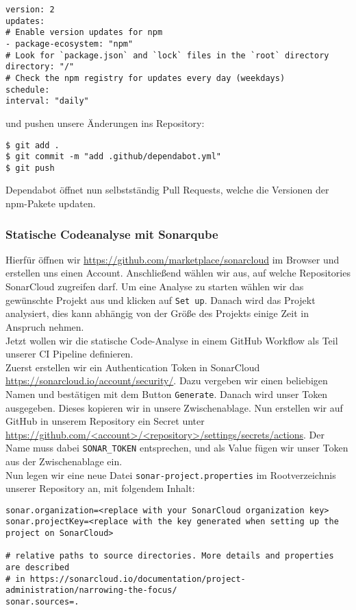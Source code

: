 \begin{verbatim}
version: 2
updates:
# Enable version updates for npm
- package-ecosystem: "npm"
# Look for `package.json` and `lock` files in the `root` directory
directory: "/"
# Check the npm registry for updates every day (weekdays)
schedule:
interval: "daily"
\end{verbatim}

\noindent
und pushen unsere Änderungen ins Repository:

\begin{verbatim}
$ git add .
$ git commit -m "add .github/dependabot.yml"
$ git push
\end{verbatim}

\noindent
Dependabot öffnet nun selbstständig Pull Requests,
welche die Versionen der npm-Pakete updaten.

\subsubsection{Statische Codeanalyse mit Sonarqube}
Hierfür öffnen wir \url{https://github.com/marketplace/sonarcloud}
im Browser und erstellen uns einen Account.
Anschließend wählen wir aus, auf welche Repositories
SonarCloud zugreifen darf.
Um eine Analyse zu starten wählen wir das gewünschte Projekt aus 
und klicken auf \verb|Set up|.
Danach wird das Projekt analysiert, dies kann abhängig von der Größe des Projekts einige Zeit in
Anspruch nehmen. \\

\noindent
Jetzt wollen wir die statische Code-Analyse in einem
GitHub Workflow als Teil unserer CI Pipeline definieren. \\

\noindent
Zuerst erstellen wir ein Authentication Token in 
SonarCloud \url{https://sonarcloud.io/account/security/}.
Dazu vergeben wir einen beliebigen Namen und bestätigen mit 
dem Button \verb|Generate|.
Danach wird unser Token ausgegeben. 
Dieses kopieren wir in unsere Zwischenablage.
Nun erstellen wir auf GitHub in unserem Repository
ein Secret unter \url{https://github.com/<account>/<repository>/settings/secrets/actions}.
Der Name muss dabei \verb|SONAR_TOKEN| entsprechen,
und als Value fügen wir unser Token aus der Zwischenablage ein. \\

\noindent
Nun legen wir eine neue Datei \verb|sonar-project.properties|
im Rootverzeichnis unserer Repository an, mit folgendem Inhalt:

\begin{verbatim}
sonar.organization=<replace with your SonarCloud organization key>
sonar.projectKey=<replace with the key generated when setting up the project on SonarCloud>

# relative paths to source directories. More details and properties are described
# in https://sonarcloud.io/documentation/project-administration/narrowing-the-focus/
sonar.sources=.
\end{verbatim}

